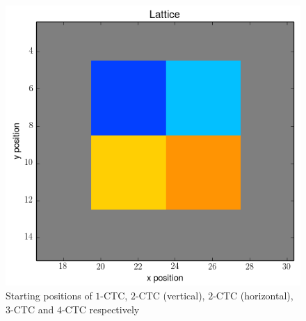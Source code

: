 \documentclass[12pt]{article}
\begin{document}
\begin{figure}[h]
	\includegraphics[scale=0.20]{img/4ctc-start}
	\caption{Starting positions of $1$-CTC, $2$-CTC (vertical), $2$-CTC (horizontal), $3$-CTC and $4$-CTC respectively}
	\label{race_start}
\end{figure}
\end{document}
